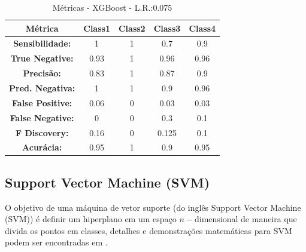 \documentclass[
	article,			%
	11pt,				%
	oneside,			%
	a4paper,			%
	english,			%
	brazil,				%
	sumario=tradicional
	]{abntex2}
\begin{document}
\begin{table}[H]
\centering
\begin{tabular}{|c|c|c|c|c|}
\hline
\textbf{Métrica}         & \textbf{Class1} & \textbf{Class2} & \textbf{Class3} & \textbf{Class4} \\ \hline
\textbf{Sensibilidade:}  & 1               & 1               & 0.7             & 0.9             \\ \hline
\textbf{True Negative:}  & 0.93            & 1               & 0.96            & 0.96            \\ \hline
\textbf{Precisão:}       & 0.83            & 1               & 0.87            & 0.9             \\ \hline
\textbf{Pred. Negativa:} & 1               & 1               & 0.9             & 0.96            \\ \hline
\textbf{False Positive:} & 0.06            & 0               & 0.03            & 0.03            \\ \hline
\textbf{False Negative:} & 0               & 0               & 0.3             & 0.1             \\ \hline
\textbf{F Discovery:}    & 0.16            & 0               & 0.125           & 0.1             \\ \hline
\textbf{Acurácia:}       & 0.95            & 1               & 0.9             & 0.95            \\ \hline
\end{tabular}
\caption{Métricas - XGBoost - L.R.:$0.075$}
\label{tab:metrics_xgb}
\end{table}

\newpage
\subsection{Support Vector Machine (SVM)}

O objetivo de uma máquina de vetor suporte (do inglês Support Vector Machine (SVM)) é definir um hiperplano em um espaço $n-$dimensional de maneira que divida os pontos em classes, detalhes e demonstrações matemáticas para SVM podem ser encontradas em \cite{bishop:2006:PRML, Smola04atutorial}.
\end{document}

